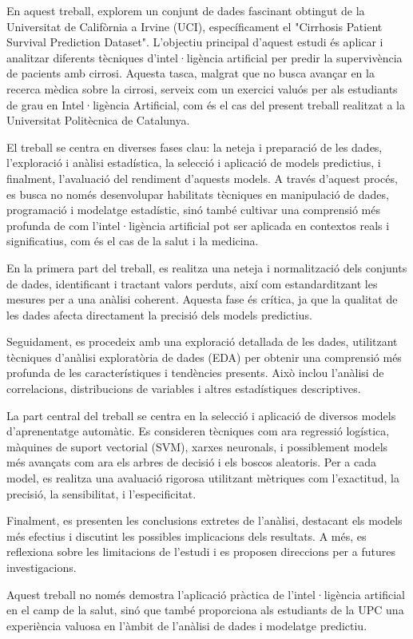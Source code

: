 En aquest treball, explorem un conjunt de dades fascinant obtingut de la Universitat de Califòrnia a Irvine (UCI), específicament el "Cirrhosis Patient Survival Prediction Dataset". L'objectiu principal d'aquest estudi és aplicar i analitzar diferents tècniques d'intel·ligència artificial per predir la supervivència de pacients amb cirrosi. Aquesta tasca, malgrat que no busca avançar en la recerca mèdica sobre la cirrosi, serveix com un exercici valuós per als estudiants de grau en Intel·ligència Artificial, com és el cas del present treball realitzat a la Universitat Politècnica de Catalunya.

El treball se centra en diverses fases clau: la neteja i preparació de les dades, l'exploració i anàlisi estadística, la selecció i aplicació de models predictius, i finalment, l'avaluació del rendiment d'aquests models. A través d'aquest procés, es busca no només desenvolupar habilitats tècniques en manipulació de dades, programació i modelatge estadístic, sinó també cultivar una comprensió més profunda de com l'intel·ligència artificial pot ser aplicada en contextos reals i significatius, com és el cas de la salut i la medicina.

En la primera part del treball, es realitza una neteja i normalització dels conjunts de dades, identificant i tractant valors perduts, així com estandarditzant les mesures per a una anàlisi coherent. Aquesta fase és crítica, ja que la qualitat de les dades afecta directament la precisió dels models predictius.

Seguidament, es procedeix amb una exploració detallada de les dades, utilitzant tècniques d'anàlisi exploratòria de dades (EDA) per obtenir una comprensió més profunda de les característiques i tendències presents. Això inclou l'anàlisi de correlacions, distribucions de variables i altres estadístiques descriptives.

La part central del treball se centra en la selecció i aplicació de diversos models d'aprenentatge automàtic. Es consideren tècniques com ara regressió logística, màquines de suport vectorial (SVM), xarxes neuronals, i possiblement models més avançats com ara els arbres de decisió i els boscos aleatoris. Per a cada model, es realitza una avaluació rigorosa utilitzant mètriques com l'exactitud, la precisió, la sensibilitat, i l'especificitat.

Finalment, es presenten les conclusions extretes de l'anàlisi, destacant els models més efectius i discutint les possibles implicacions dels resultats. A més, es reflexiona sobre les limitacions de l'estudi i es proposen direccions per a futures investigacions.

Aquest treball no només demostra l'aplicació pràctica de l'intel·ligència artificial en el camp de la salut, sinó que també proporciona als estudiants de la UPC una experiència valuosa en l'àmbit de l'anàlisi de dades i modelatge predictiu.